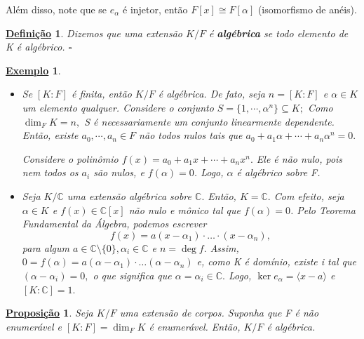 \documentclass{article}
\newtheorem*{def*}{\underline{Defini\c c\~ao}}
\newtheorem*{prop*}{\underline{Proposi\c c\~ao}}
\newtheorem{example}{\underline{Exemplo}}
\begin{document}
    Além disso, note que se \(e_{\alpha }\) é injetor, então \(F[x]\cong{F[\alpha ]}\) (isomorfismo de anéis).
    \begin{def*}
      Dizemos que uma extensão \(K/F\) é \textbf{algébrica} se todo elemento de K é algébrico. \(\square\)
    \end{def*}
    \begin{example}
      \begin{itemize}
        \item[1)] Se \([K:F]\) é finita, então \(K/F\) é algébrica. De fato, seja \(n=[K:F]\) e \(\alpha \in K\) um elemento qualquer.
          Considere o conjunto \(S = \{1, \cdots, \alpha ^{n}\}\subseteq{K};\) Como \(\dim_{F}K = n,\) S é necessariamente um conjunto linearmente
          dependente. Então, existe \(a_{0}, \cdots, a_{n}\in F\) não todos nulos tais que \(a_{0} + a_{1}\alpha + \cdots + a_{n}\alpha^{n} = 0.\)

          Considere o polinômio \(f(x) = a_{0}+a_{1}x + \cdots + a_{n}x^{n}.\) Ele é não nulo, pois nem todos os \(a_{i}\) são nulos,
          e \(f(\alpha ) = 0\). Logo, \(\alpha \) é algébrico sobre F.

        \item[2)] Seja \(K/\mathbb{C}\) uma extensão algébrica sobre \(\mathbb{C}.\) Então, \(K = \mathbb{C}.\) Com efeito, seja \(\alpha \in K\)
          e \(f(x)\in \mathbb{C}[x]\) não nulo e mônico tal que \(f(\alpha ) = 0\). Pelo Teorema Fundamental da Álgebra, podemos escrever 
          \[
            f(x) = a(x-\alpha_{1})\cdot \dotsc \cdot (x-\alpha_{n}),
          \]
          para algum \(a\in \mathbb{C}\setminus{\{0\}},\alpha_{i}\in \mathbb{C}\) e \(n = \deg{f}.\) Assim, \(0 = f(\alpha ) = a(\alpha -\alpha_{1})\cdot \dotsc(\alpha -\alpha_{n})\)
          e, como K é domínio, existe i tal que \((\alpha -\alpha_{i})=0,\) o que significa que \(\alpha=\alpha_{i}\in \mathbb{C}.\) Logo, \(\ker{e_{\alpha }}=\langle x-a \rangle\) e \([K:\mathbb{C}] = 1.\)
      \end{itemize}
    \end{example}
    \begin{prop*}
      Seja \(K/F\) uma extensão de corpos. Suponha que F é não enumerável e \([K:F]=\dim_{F}K\) é enumerável. Então,
      \(K/F\) é algébrica.
    \end{prop*}
\end{document}

